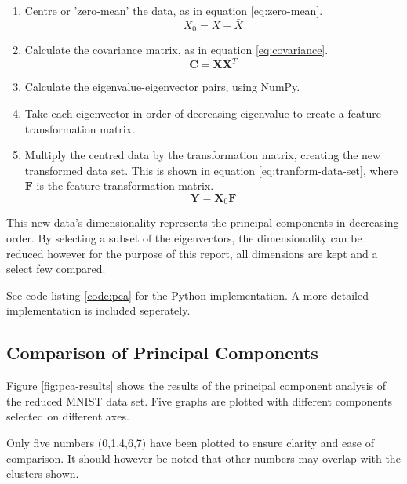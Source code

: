 \documentclass[11pt,journal,transmag,final]{IEEEtran}
\begin{document}
\begin{enumerate}
    \item Centre or 'zero-mean' the data, as in equation \ref{eq:zero-mean}.
    \begin{equation}
        X_0 = X - \bar{X}
        \label{eq:zero-mean}
    \end{equation}
    \item Calculate the covariance matrix, as in equation \ref{eq:covariance}.
    \begin{equation}
        \textbf{C} = \textbf{X} \textbf{X}^T
        \label{eq:covariance}
    \end{equation}
    \item Calculate the eigenvalue-eigenvector pairs, using NumPy.
    \item Take each eigenvector in order of decreasing eigenvalue to create a feature transformation matrix.
    \item Multiply the centred data by the transformation matrix, creating the new transformed data set. This is shown in equation \ref{eq:tranform-data-set}, where $\textbf{F}$ is the feature transformation matrix.
    \begin{equation}
        \textbf{Y} = \textbf{X}_0 \textbf{F}
        \label{eq:tranform-data-set}
    \end{equation}
\end{enumerate}

This new data's dimensionality represents the principal components in decreasing order. By selecting a subset of the eigenvectors, the dimensionality can be reduced however for the purpose of this report, all dimensions are kept and a select few compared.

See code listing \ref{code:pca} for the Python implementation. A more detailed implementation is included seperately.

\subsection{Comparison of Principal Components}

Figure \ref{fig:pca-results} shows the results of the principal component analysis of the reduced MNIST data set. Five graphs are plotted with different components selected on different axes.

Only five numbers (0,1,4,6,7) have been plotted to ensure clarity and ease of comparison. It should however be noted that other numbers may overlap with the clusters shown.
\end{document}
